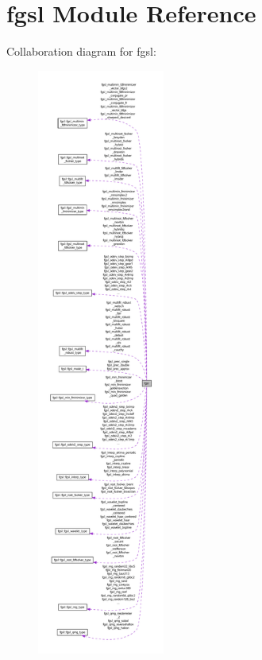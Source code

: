 \hypertarget{classfgsl}{\section{fgsl Module Reference}
\label{classfgsl}
}


Collaboration diagram for fgsl\-:
\nopagebreak
\begin{figure}[H]
\begin{center}
\leavevmode
\includegraphics[height=550pt]{classfgsl__coll__graph}
\end{center}
\end{figure}
